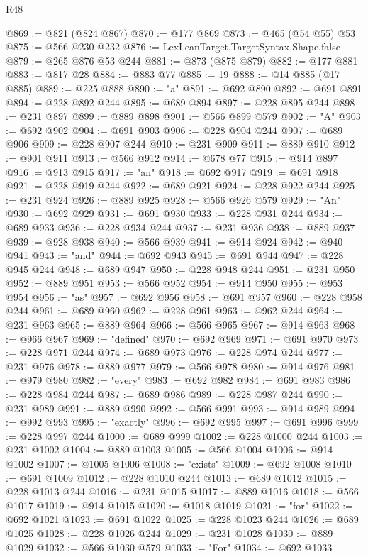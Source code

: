 \begin{lexlean}{R48}
\begin{coremodule}
@869 := @821 (@824 @867)
@870 := @177 @869
@873 := @465 (@54 @55) @53
@875 := @566 @230 @232
@876 := LexLeanTarget.TargetSyntax.Shape.false
@879 := @265 @876 @53 @244
@881 := @873 (@875 @879)
@882 := @177 @881
@883 := @817 @28
@884 := @883 @77
@885 := 19
@888 := @14 @885 (@17 @885)
@889 := @225 @888
@890 := "a"
@891 := @692 @890
@892 := @691 @891
@894 := @228 @892 @244
@895 := @689 @894
@897 := @228 @895 @244
@898 := @231 @897
@899 := @889 @898
@901 := @566 @899 @579
@902 := "A"
@903 := @692 @902
@904 := @691 @903
@906 := @228 @904 @244
@907 := @689 @906
@909 := @228 @907 @244
@910 := @231 @909
@911 := @889 @910
@912 := @901 @911
@913 := @566 @912
@914 := @678 @77
@915 := @914 @897
@916 := @913 @915
@917 := "an"
@918 := @692 @917
@919 := @691 @918
@921 := @228 @919 @244
@922 := @689 @921
@924 := @228 @922 @244
@925 := @231 @924
@926 := @889 @925
@928 := @566 @926 @579
@929 := "An"
@930 := @692 @929
@931 := @691 @930
@933 := @228 @931 @244
@934 := @689 @933
@936 := @228 @934 @244
@937 := @231 @936
@938 := @889 @937
@939 := @928 @938
@940 := @566 @939
@941 := @914 @924
@942 := @940 @941
@943 := "and"
@944 := @692 @943
@945 := @691 @944
@947 := @228 @945 @244
@948 := @689 @947
@950 := @228 @948 @244
@951 := @231 @950
@952 := @889 @951
@953 := @566 @952
@954 := @914 @950
@955 := @953 @954
@956 := "as"
@957 := @692 @956
@958 := @691 @957
@960 := @228 @958 @244
@961 := @689 @960
@962 := @228 @961
@963 := @962 @244
@964 := @231 @963
@965 := @889 @964
@966 := @566 @965
@967 := @914 @963
@968 := @966 @967
@969 := "defined"
@970 := @692 @969
@971 := @691 @970
@973 := @228 @971 @244
@974 := @689 @973
@976 := @228 @974 @244
@977 := @231 @976
@978 := @889 @977
@979 := @566 @978
@980 := @914 @976
@981 := @979 @980
@982 := "every"
@983 := @692 @982
@984 := @691 @983
@986 := @228 @984 @244
@987 := @689 @986
@989 := @228 @987 @244
@990 := @231 @989
@991 := @889 @990
@992 := @566 @991
@993 := @914 @989
@994 := @992 @993
@995 := "exactly"
@996 := @692 @995
@997 := @691 @996
@999 := @228 @997 @244
@1000 := @689 @999
@1002 := @228 @1000 @244
@1003 := @231 @1002
@1004 := @889 @1003
@1005 := @566 @1004
@1006 := @914 @1002
@1007 := @1005 @1006
@1008 := "exists"
@1009 := @692 @1008
@1010 := @691 @1009
@1012 := @228 @1010 @244
@1013 := @689 @1012
@1015 := @228 @1013 @244
@1016 := @231 @1015
@1017 := @889 @1016
@1018 := @566 @1017
@1019 := @914 @1015
@1020 := @1018 @1019
@1021 := "for"
@1022 := @692 @1021
@1023 := @691 @1022
@1025 := @228 @1023 @244
@1026 := @689 @1025
@1028 := @228 @1026 @244
@1029 := @231 @1028
@1030 := @889 @1029
@1032 := @566 @1030 @579
@1033 := "For"
@1034 := @692 @1033

\end{coremodule}
\end{lexlean}

